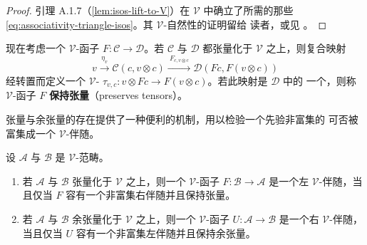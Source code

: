 \begin{proof}
引理 A.1.7（\cref{lem:isos-lift-to-V}）在 $\mathcal{V}$ 中确立了所需的那些%
\trIsomorphism
\eqref{eq:associativity-triangle-isos}。其 $\mathcal{V}$-自然性的证明留给
读者，或见 \cite[\S\,1.8]{bib68}。
\end{proof}

现在考虑一个 $\mathcal{V}$-函子 $F\colon\mathcal{C}\to\mathcal{D}$。若
$\mathcal{C}$ 与 $\mathcal{D}$ 都张量化于 $\mathcal{V}$ 之上，则复合映射
\[ v\xrightarrow{\ \eta_{v}\ }\mathcal{C}(c,v\otimes c)
   \xrightarrow{\ F_{c,v\otimes c}\ }\mathcal{D}(Fc,F(v\otimes c)) \]
经转置而定义一个\trCanonical{} $\mathcal{V}$-\trNaturalTransformation{}
$\tau_{v,c}\colon v\otimes Fc\to F(v\otimes c)$。若此映射是 $\mathcal{D}$ 中的
一个\trIsomorphism，则称 $\mathcal{V}$-函子 $F$ \textbf{保持张量}（preserves
tensors）。

张量与余张量的存在提供了一种便利的机制，用以检验一个先验非富集的%
\trAdjunction{}可否被富集成一个 $\mathcal{V}$-伴随。

\begin{proposition}\label{prop:enriched-adjoint-preserves-tensors}
设 $\mathcal{A}$ 与 $\mathcal{B}$ 是 $\mathcal{V}$-范畴。
\begin{enumerate}[label=(\roman*)]
\item 若 $\mathcal{A}$ 与 $\mathcal{B}$ 张量化于 $\mathcal{V}$ 之上，则一个
  $\mathcal{V}$-函子 $F\colon\mathcal{B}\to\mathcal{A}$ 是一个左
  $\mathcal{V}$-伴随，当且仅当 $F$ 容有一个非富集右伴随并且保持张量。
\item 若 $\mathcal{A}$ 与 $\mathcal{B}$ 余张量化于 $\mathcal{V}$ 之上，则一个
  $\mathcal{V}$-函子 $U\colon\mathcal{A}\to\mathcal{B}$ 是一个右
  $\mathcal{V}$-伴随，当且仅当 $U$ 容有一个非富集左伴随并且保持余张量。
\end{enumerate}
\end{proposition}

